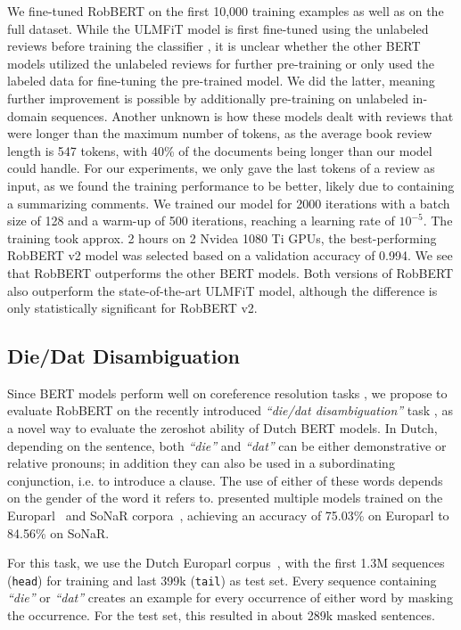 \documentclass[11pt,a4paper]{article}
\begin{document}
We fine-tuned RobBERT on the first 10,000 training examples as well as on the full dataset.
While the ULMFiT model is first fine-tuned using the unlabeled reviews before training the classifier \citep{vanderburghMerits2019}, it is unclear whether the other BERT models utilized the unlabeled reviews for further pre-training \citep{sun2019classification} or only used the labeled data for fine-tuning the pre-trained model.
We did the latter, meaning further improvement is possible by additionally pre-training on unlabeled in-domain sequences.
Another unknown is how these models dealt with reviews that were longer than the maximum number of tokens, 
as the average book review length is 547 tokens, with 40\% of the documents being longer than our model could handle.
For our experiments, we only gave the last tokens of a review as input, as we found the training performance to be better,
likely due to containing a summarizing comments.
We trained our model for 2000 iterations with a batch size of 128 and a warm-up of 500 iterations, reaching a learning rate of $10^{-5}$. 
The training took approx. 2 hours on 2 Nvidea 1080 Ti GPUs, the best-performing RobBERT v2 model was selected based on a validation accuracy of 0.994. 
We see that RobBERT outperforms the other BERT models.
Both versions of RobBERT also outperform the state-of-the-art ULMFiT model, although the difference is only statistically significant for RobBERT v2.

\subsection{Die/Dat Disambiguation}\label{ss:die-dat}

Since BERT models perform well on coreference resolution tasks \citep{joshi2019coreference}, we propose to evaluate RobBERT on the recently introduced \emph{``die/dat disambiguation''} task \citep{alleinBinary2020}, as a novel way to evaluate the zeroshot ability of Dutch BERT models.
In Dutch, depending on the sentence, both \emph{``die''} and \emph{``dat''} can be either demonstrative or relative pronouns; in addition they can also be used in a subordinating conjunction, i.e. to introduce a clause.
The use of either of these words depends on the gender of the word it refers to.
\citet{alleinBinary2020} presented multiple models trained on the Europarl~\citep{koehnEuroparl2005a} and SoNaR corpora~\citep{oostdijkConstruction2013}, achieving an accuracy of 75.03\% on Europarl to 84.56\% on SoNaR.

For this task, we use the Dutch Europarl corpus~\citep{koehnEuroparl2005a}, with the first 1.3M sequences ({\tt head}) for training and last 399k ({\tt tail}) as test set. 
Every sequence containing \emph{``die''} or \emph{``dat''} creates an example for every occurrence of either word by masking the occurrence.
For the test set, this resulted in about 289k masked sentences.
\end{document}

